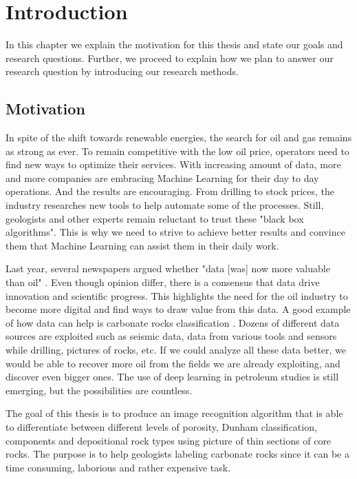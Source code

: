 \chapter{Introduction}
\label{chp:introduction} 
In this chapter we explain the motivation for this thesis and state our goals and research questions. Further, we  proceed to explain how we plan to answer our research question by introducing our research methods.   
\section{Motivation}
In spite of the shift towards renewable energies, the search for oil and gas remains as strong as ever. To remain competitive with the low oil price, operators need to find new ways to optimize their services. 
With increasing amount of data,  more and more companies are embracing Machine Learning for their day to day operations. And the results are encouraging. 
From drilling to stock prices, the industry researches new tools to help automate some of the processes. 
Still, geologists and other experts remain reluctant to trust these "black box algorithms". This is why we need to strive to achieve better results and convince them that Machine Learning can assist them in their daily work.

Last year, several newspapers argued whether "data [was] now more valuable than oil" \cite{economist,forbes}. Even though opinion differ, there is a consensus that data drive innovation and scientific progress. This highlights the need for the oil industry to become more digital and find ways to draw value from this data. A good example of how data can help is carbonate rocks classification \cite{carbo}. Dozens of different data sources are exploited such as seismic data, data from various tools and sensors while drilling, pictures of rocks, etc. If  we could analyze all these data better, we would be able to recover more oil from the fields we are already exploiting, and discover even bigger ones. The use of deep learning in petroleum studies is still emerging, but the possibilities are countless.


The goal of this thesis is to produce an image recognition algorithm that is able to differentiate between different levels of porosity,  Dunham classification, components and depositional rock types using picture of thin sections of core rocks. The purpose is to help geologists labeling carbonate rocks since it can be a time consuming, laborious and rather expensive task. 

